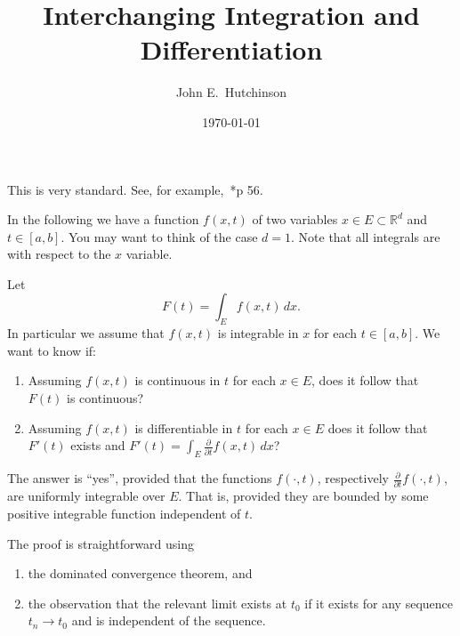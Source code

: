 \documentclass[a4paper]{amsart}
\theoremstyle{plain}
\theoremstyle{definition}
\theoremstyle{remark}
\begin{document}
\title{Interchanging Integration and Differentiation}  
\author{John E.\ Hutchinson}
\date{\today}


\maketitle




This is very standard.  See, for example,~\cite{Fol}*{p 56}.


\medskip In the following we have a function $ f(x,t) $ of two variables $ x \in E \subset   \mathbb{R}^d  $ and $ t \in[a,b]$.  You may want to think of the case $ d=1 $.  Note that all integrals are with respect to the $ x $ variable.


Let  
\[
F(t) = \int_E f(x,t)\, dx.
\]
In particular we assume that $ f(x,t ) $ is integrable in  $ x $ for   each $ t\in [a,b] $.  We want to know if:
\begin{enumerate}

\item  Assuming $ f(x,t) $ is continuous in $ t $ for each $ x\in E $, does it follow that $ F(t) $ is continuous?
\item Assuming $ f(x,t) $ is differentiable in $ t $ for each $ x \in E $ does it follow that $ F'(t) $ exists and 
$ F'(t) = \int_E \frac{\partial}{\partial t} f(x,t)\, dx $?
\end{enumerate}

The answer is ``yes'', provided that the functions $ f(\cdot, t) $, respectively $ \frac{\partial}{\partial t} f(\cdot  ,t)$, are uniformly integrable over $ E $.  That is, provided they are bounded by some positive integrable function independent of $t  $.


\medskip
The proof is straightforward using 
\begin{enumerate}

\item the dominated convergence theorem, and
\item    the observation that the relevant limit  exists at $ t_0 $   if it exists    for any sequence  $ t_n \to t_0   $ and is independent of the sequence.
\end{enumerate} 
 
\end{document}
